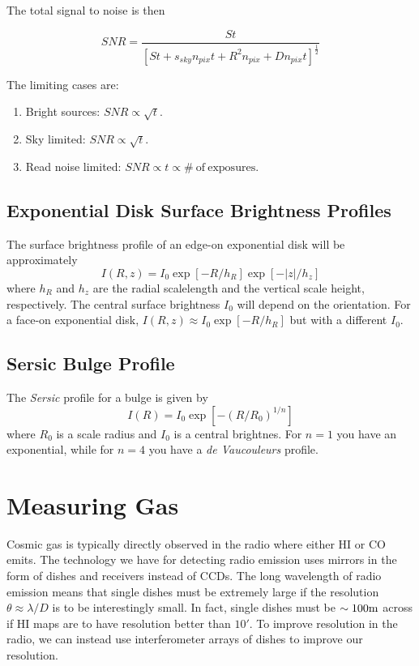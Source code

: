 \documentclass[]{article}
\begin{document}
The total signal to noise is then

\begin{equation}
SNR = \frac{St}{\left[St + s_{sky}n_{pix}t + R^2 n_{pix} + Dn_{pix}t\right]^{\frac{1}{2}}}
\end{equation}

The limiting cases are:

\begin{enumerate}
\item Bright sources: $SNR\propto\sqrt{t}$.
\item Sky limited: $SNR\propto\sqrt{t}$.
\item Read noise limited: $SNR\propto t \propto\mathrm{\#~of~exposures}$.
\end{enumerate}

\subsection{Exponential Disk Surface Brightness Profiles}

The surface brightness profile of an edge-on exponential disk will be approximately
\begin{equation}
I(R,z) = I_0 \exp[-R/h_R] \exp[-|z|/h_z]
\end{equation}
\noindent
where $h_R$ and $h_z$ are the radial scalelength and the vertical scale height,
respectively. The central surface brightness $I_0$ will depend on the orientation.
For a face-on exponential disk, $I(R,z)\approx I_0 \exp[-R/h_R]$ but with a different $I_0$.

\subsection{Sersic Bulge Profile}

The {\it Sersic} profile for a bulge is given by
\begin{equation}
I(R) = I_0 \exp[-(R/R_0)^{1/n}]
\end{equation}
\noindent
where $R_0$ is a scale radius and $I_0$ is a central
brightnes. For $n=1$ you have an exponential, while for $n=4$ you
have a {\it de Vaucouleurs} profile.

\section{Measuring Gas}

Cosmic gas is typically directly observed in the radio where
either HI or CO emits. The technology we have for detecting
radio emission uses mirrors in the form of dishes and
receivers instead of CCDs. The long wavelength of radio
emission means that single dishes must be extremely large
if the resolution $\theta \approx \lambda/D$ is to be
interestingly small. In fact, single dishes must be $\sim100\mathrm{m}$
across if HI maps are to have resolution better than $10'$.
To improve resolution in the radio, we can instead use
interferometer arrays of dishes to improve our resolution.
\end{document}
